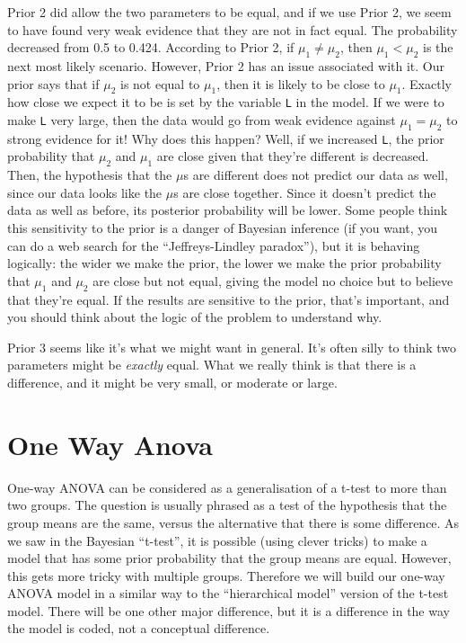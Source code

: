 Prior 2 did allow the two parameters to be equal, and if we use Prior 2, we
seem to have found very weak evidence that they are not in fact equal. The probability
decreased from 0.5 to 0.424. According to Prior 2, if $\mu_1 \neq \mu_2$, then
$\mu_1 < \mu_2$ is the next most likely scenario. However, Prior 2 has an issue
associated with it. Our prior says that if $\mu_2$ is not equal to $\mu_1$, then
it is likely to be close to $\mu_1$. Exactly how close we expect it to be is
set by the variable {\tt L} in the model.
If we were to make {\tt L} very large, then the data would go from weak evidence
against $\mu_1 = \mu_2$ to strong evidence for it! Why does this happen? Well,
if we increased {\tt L}, the prior probability that $\mu_2$ and $\mu_1$ are
close given that they're different is decreased. Then, the hypothesis that
the $\mu$s are different does not predict our data as well, since our data
looks like the $\mu$s are close together. Since it doesn't predict the data as
well as before, its posterior probability will be lower.
 Some people think this sensitivity to the prior is a
danger of Bayesian inference (if you want, you can do a web search for the
``Jeffreys-Lindley paradox''),
but it is behaving logically: the wider we make
the prior, the lower we make the prior probability that $\mu_1$ and $\mu_2$
are close but not equal, giving the model no choice but to believe that they're
equal. If the results are sensitive to the prior, that's important, and you
should think about the logic of the problem to understand why.

Prior 3 seems like it's what we might want in general. It's often silly to think
two parameters might be {\it exactly} equal. What we really think is that there
is a difference, and it might be very small, or moderate or large.

\section{One Way Anova}
One-way ANOVA can be considered as a generalisation of a t-test to more than
two groups. The question is usually phrased as a test of the hypothesis that
the group means are the same, versus the alternative that there is some difference.
As we saw in the Bayesian ``t-test'', it is possible (using clever tricks) to
make a model that has some prior probability that the group means are equal.
However, this gets more tricky with multiple groups. Therefore we will build our
one-way ANOVA model in a similar way to the ``hierarchical model'' version of the
t-test model. There will be one other major difference, but it is a difference
in the way the model is coded, not a conceptual difference.

